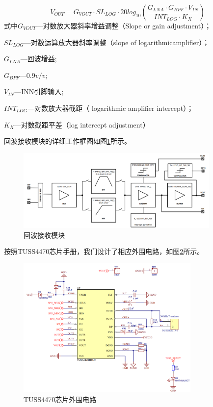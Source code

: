 \begin{equation}
	V_{OUT}=G_{VOUT} \cdot SL_{LOG}\cdot20log_{10}(\frac{G_{LNA} \cdot G_{BPF} \cdot V_{IN}}{INT_{LOG} \cdot K_X})
	\label{VOUT公式}
\end{equation}
式中\quad $G_{VOUT}$---对数放大器斜率增益调整（Slope or gain adjustment）；\par
\quad$SL_{LOG}$---对数运算放大器斜率调整（slope of logarithmicamplifier）；\par
\quad$G_{LNA}$---回波增益;\par
\quad$G_{BPF}$---$0.9v/v$;\par
\quad$V_{IN}$---INN引脚输入;\par
\quad$INT_{LOG}$---对数放大器截距（ logarithmic amplifier intercept）；\par
\quad$K_X$---对数截距平差（log intercept adjustment）\par
回波接收模块的详细工作框图如图\ref{回波接收模块}所示。
\begin{figure}[ht]
	\centering
	\includegraphics[width=10cm]{figure/Analog Front-End Block Diagram.png}
	\caption{回波接收模块}
	\label{回波接收模块}
\end{figure}\par
按照TUSS4470芯片手册，我们设计了相应外围电路，如图\ref{TUSS4470芯片外围电路}所示。
\begin{figure}[!h]
	\centering
	\includegraphics[width=9cm]{figure/TUSS4470 peripheral circuit.png}
	\caption{TUSS4470芯片外围电路}
	\label{TUSS4470芯片外围电路}
\end{figure}
\newpage

